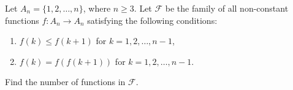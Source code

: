\documentclass{article}
\begin{document}
	\setlength{\parindent}{0pt}
	Let $A_n=\{1,2,\dots,n\}$, where $n\geq3$. Let $\mathcal{F}$ be the family of all non-constant functions $f:A_n\to A_n$ satisfying the following conditions:
	\begin{enumerate}[label=(\arabic*)]
		\item  $f(k)\leq f(k+1)$ for $k=1,2,\dots,n-1$,
		\item $f(k)=f(f(k+1))$ for $k=1,2,\dots,n-1$.
	\end{enumerate}
	Find the number of functions in $\mathcal{F}$.
\end{document}
